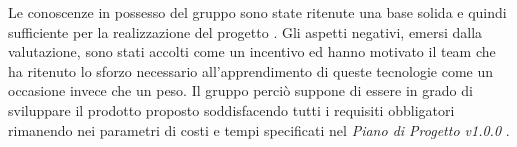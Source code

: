 Le conoscenze in possesso del gruppo \GRUPPO{} sono state ritenute una base solida e quindi sufficiente per la realizzazione del progetto \PROGETTO.
Gli aspetti negativi, emersi dalla valutazione, sono stati accolti come un incentivo ed hanno motivato il team che ha ritenuto lo sforzo necessario all'apprendimento di queste tecnologie come un occasione invece che un peso.
Il gruppo perciò suppone di essere in grado di sviluppare il prodotto proposto soddisfacendo tutti i requisiti obbligatori rimanendo nei parametri di costi e tempi specificati nel \textit{Piano di Progetto v1.0.0} .

